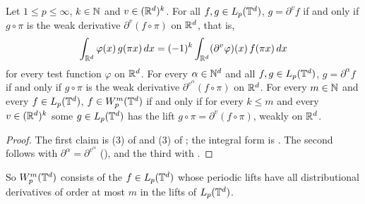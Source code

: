 \begin{theorem}
\label{thm:torus-weak-derivative-lift}
\leanok
{}
Let $1 \leq p \leq \infty$, $k \in \mathbb{N}$ and $v \in (\mathbb{R}^d)^k$. For all $f, g \in L_p(\mathbb{T}^d)$,
$g = \partial^v f$ if and only if $g \circ \pi$ is the weak derivative $\partial^v (f \circ \pi)$
on $\mathbb{R}^d$, that is,
\[
  \int_{\mathbb{R}^d} \varphi(x) \, g(\pi x) \, dx
    = (-1)^k \int_{\mathbb{R}^d} (\partial^v \varphi)(x) \, f(\pi x) \, dx
\]
for every test function $\varphi$ on $\mathbb{R}^d$. For every $\alpha \in \mathbb{N}^d$ and all
$f, g \in L_p(\mathbb{T}^d)$, $g = \partial^\alpha f$ if and only if $g \circ \pi$ is the weak derivative
$\partial^{v^\alpha} (f \circ \pi)$ on $\mathbb{R}^d$. For every $m \in \mathbb{N}$ and every $f \in L_p(\mathbb{T}^d)$,
$f \in W^{m}_{p}(\mathbb{T}^d)$ if and only if for every $k \leq m$ and every $v \in (\mathbb{R}^d)^k$ some
$g \in L_p(\mathbb{T}^d)$ has the lift $g \circ \pi = \partial^v (f \circ \pi)$, weakly on $\mathbb{R}^d$.
\end{theorem}

\begin{proof}
\leanok
The first claim is (3) of  and (3) of
; the integral form is
. The second follows with $\partial^\alpha =
\partial^{v^\alpha}$ (), and the third with
.
\end{proof}

So $W^{m}_{p}(\mathbb{T}^d)$ consists of the $f \in L_p(\mathbb{T}^d)$ whose periodic lifts have all
distributional derivatives of order at most $m$ in the lifts of $L_p(\mathbb{T}^d)$.


